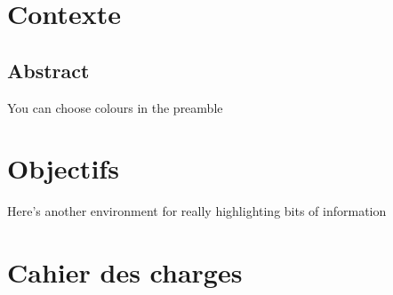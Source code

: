\section{Contexte}
\begin{summary}
\section{Abstract}

You can choose colours in the preamble

\lipsum[1]
\end{summary}

\section{Objectifs}

\begin{invsummary}
Here's another environment for really highlighting bits of information

\lipsum[2]
\end{invsummary}

\section{Cahier des charges}
\lipsum[3]
